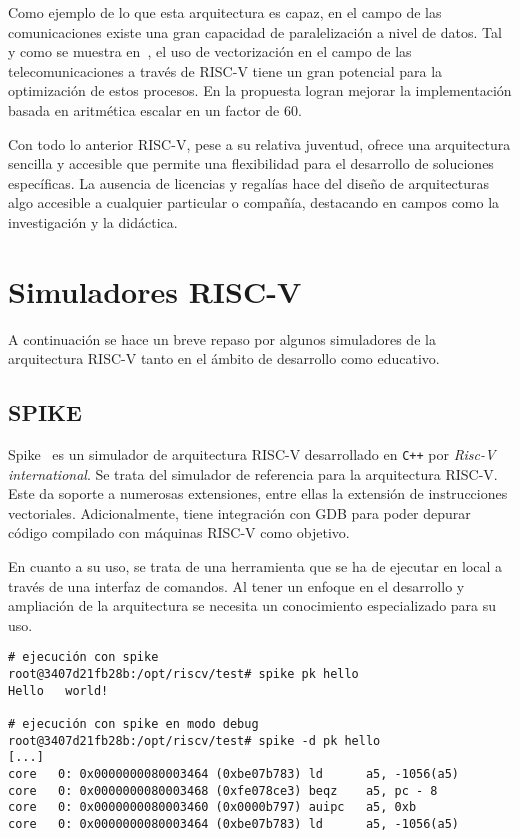 Como ejemplo de lo que esta arquitectura es capaz, en el campo de las
comunicaciones existe una gran capacidad de paralelización a nivel de datos.
Tal y como se muestra en~\cite{riscv-studyCase}, el uso de vectorización en el
campo de las telecomunicaciones a través de RISC-V tiene un gran potencial para
la optimización de estos procesos. En la propuesta logran mejorar la
implementación basada en aritmética escalar en un factor de 60.

Con todo lo anterior RISC-V, pese a su relativa juventud, ofrece una
arquitectura sencilla y accesible que permite una flexibilidad para el
desarrollo de soluciones específicas. La ausencia de licencias y regalías hace
del diseño de arquitecturas algo accesible a cualquier particular o compañía,
destacando en campos como la investigación y la didáctica.

\section{Simuladores RISC-V}

A continuación se hace un breve repaso por algunos simuladores de la
arquitectura RISC-V tanto en el ámbito de desarrollo como educativo.

\subsection{SPIKE}

Spike~\cite{spike} es un simulador de arquitectura RISC-V desarrollado en \texttt{C++}
por \textit{Risc-V international}. Se trata del simulador de
referencia para la arquitectura RISC-V. Este da soporte a numerosas extensiones,
entre ellas la extensión de instrucciones vectoriales.  Adicionalmente, tiene
integración con GDB para poder depurar código compilado con máquinas RISC-V
como objetivo.

En cuanto a su uso, se trata de una herramienta que se ha de ejecutar en local
a través de una interfaz de comandos. Al tener un enfoque en el desarrollo y
ampliación de la arquitectura se necesita un conocimiento especializado para su
uso.

\begin{lstlisting}
# ejecución con spike
root@3407d21fb28b:/opt/riscv/test# spike pk hello
Hello   world!

# ejecución con spike en modo debug
root@3407d21fb28b:/opt/riscv/test# spike -d pk hello
[...]
core   0: 0x0000000080003464 (0xbe07b783) ld      a5, -1056(a5)
core   0: 0x0000000080003468 (0xfe078ce3) beqz    a5, pc - 8
core   0: 0x0000000080003460 (0x0000b797) auipc   a5, 0xb
core   0: 0x0000000080003464 (0xbe07b783) ld      a5, -1056(a5)
\end{lstlisting}

